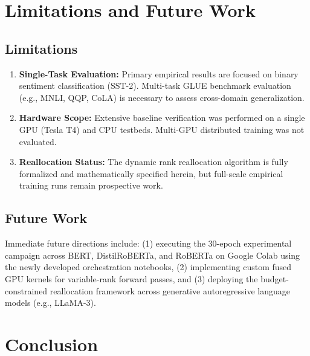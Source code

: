 \documentclass[conference]{IEEEtran}
\begin{document}
\section{Limitations and Future Work}
\label{sec:limitations}

\subsection{Limitations}
\begin{enumerate}
  \item \textbf{Single-Task Evaluation:} Primary empirical results are focused on binary sentiment classification (SST-2). Multi-task GLUE benchmark evaluation (e.g., MNLI, QQP, CoLA) is necessary to assess cross-domain generalization.
  \item \textbf{Hardware Scope:} Extensive baseline verification was performed on a single GPU (Tesla T4) and CPU testbeds. Multi-GPU distributed training was not evaluated.
  \item \textbf{Reallocation Status:} The dynamic rank reallocation algorithm is fully formalized and mathematically specified herein, but full-scale empirical training runs remain prospective work.
\end{enumerate}

\subsection{Future Work}
Immediate future directions include: (1) executing the 30-epoch experimental campaign across BERT, DistilRoBERTa, and RoBERTa on Google Colab using the newly developed orchestration notebooks, (2) implementing custom fused GPU kernels for variable-rank forward passes, and (3) deploying the budget-constrained reallocation framework across generative autoregressive language models (e.g., LLaMA-3).

\section{Conclusion}
\label{sec:conclusion}
\end{document}
